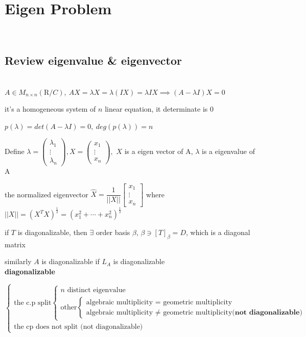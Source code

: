 \newpage
\section{Eigen Problem}$ $\\

\subsection{Review  eigenvalue \& eigenvector} $ $\\ 

$A \in M_{n \times n}(\mathrm{R}/C), ~AX = \lambda X = \lambda (IX) = \lambda IX \implies (A - \lambda I)X = 0$

it's a homogeneous system of $n$ linear equation, it determinate is $0$  

$p(\lambda) = det(A - \lambda I) = 0,~ deg(p(\lambda)) = n$

Define $\lambda = \left(\begin{matrix} \lambda_1 \\ \vdots \\ \lambda_n \end{matrix} \right), X = \left(\begin{matrix}x_1\\ \vdots \\ x_n \end{matrix} \right),$ $X$ is a eigen vector of A, $\lambda$ is a eigenvalue of A

the normalized eigenvector $\hat{X} = \dfrac{1}{||X||}\left[\begin{matrix}
	x_1 \\ \vdots \\ x_n \end{matrix} \right]$ where $||X|| = (X^TX)^{\frac{1}{2}}  = (x_1^2+\cdots+x_n^2)^{\frac{1}{2}}$

if $T$ is diagonalizable, then $\exists$ order basis $\beta$, $\beta \ni [T]_{\beta} = D$, which is a diagonal matrix

similarly $A$ is diagonalizable if $L_A$ is diagonalizable \\

\textbf{diagonalizable}

$\begin{cases} \text{the c.p  split} \begin{cases}n \text{ distinct eigenvalue}\\\text{other}\begin{cases}\text{algebraic multiplicity = geometric multiplicity} \\ \text{algebraic multiplicity $\neq$ geometric multiplicity}\textbf{(not diagonalizable)} \end{cases}\end{cases}\\\text{the cp does not split (not diagonalizable)}\end{cases}$

